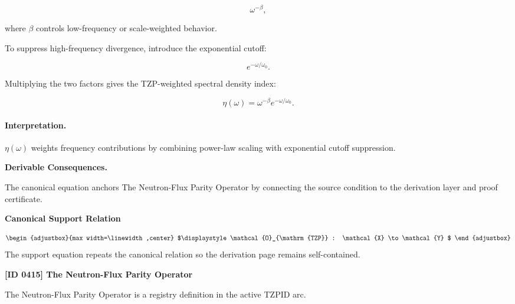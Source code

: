 \begin{equation}
\omega^{-\beta},
\end{equation}

where $\beta$ controls low-frequency or scale-weighted behavior.

To suppress high-frequency divergence, introduce the exponential cutoff:

\begin{equation}
e^{-\omega/\omega_0}.
\end{equation}

Multiplying the two factors gives the TZP-weighted spectral density index:

\begin{equation}
\boxed{
\eta(\omega)
=
\omega^{-\beta}
e^{-\omega/\omega_0}.
}
\end{equation}

\paragraph{Interpretation.}
$\eta(\omega)$ weights frequency contributions by combining power-law scaling with exponential cutoff suppression.

\par\vspace{0.35em}
\noindent\textbf{Derivable Consequences.}\quad
\begingroup
\footnotesize
\raggedright
The canonical equation anchors The Neutron-Flux Parity Operator by connecting the source condition to the derivation layer and proof certificate.
\par\endgroup

\noindent\textbf{Canonical Support Relation}\par
\[
\begin{adjustbox}{max width=\linewidth,center}
$\displaystyle
\mathcal{O}_{\mathrm{TZP}} : \mathcal{X} \to \mathcal{Y}
$
\end{adjustbox}
\]
\noindent The support equation repeats the canonical relation so the derivation page remains self-contained.\par

\clearpage
\noindent\textbf{[ID 0415] The Neutron-Flux Parity Operator}\par
\vspace{0.35em}
\begingroup\small
{}
The Neutron-Flux Parity Operator is a registry definition in the active TZPID arc.


